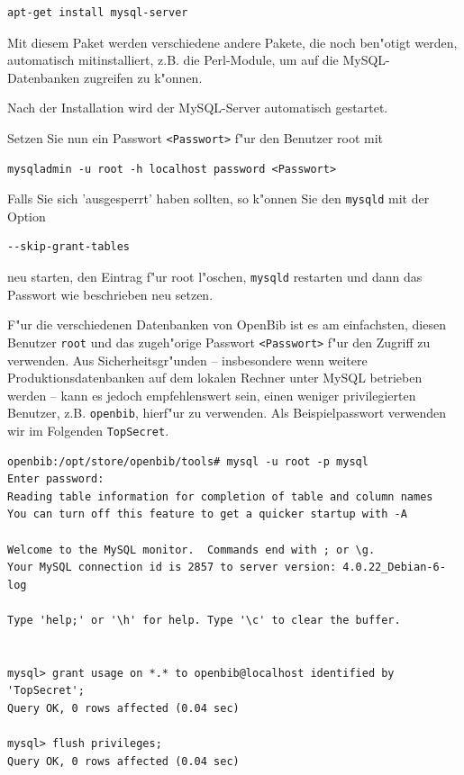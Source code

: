 \documentclass[11pt, twoside, a4paper, BCOR8mm, DIV12, bibtotoc,idxtotoc]{scrbook}
\begin{document}
\begin{verbatim}
apt-get install mysql-server
\end{verbatim}

Mit diesem Paket werden verschiedene andere Pakete, die noch ben"otigt
werden, automatisch mitinstalliert, z.B. die Perl-Module, um auf die
MySQL-Datenbanken zugreifen zu k"onnen.

Nach der Installation wird der MySQL-Server automatisch gestartet.

Setzen Sie nun ein Passwort \texttt{<Passwort>} f"ur den Benutzer root mit

\begin{verbatim}
mysqladmin -u root -h localhost password <Passwort>
\end{verbatim}

Falls Sie sich 'ausgesperrt' haben sollten, so k"onnen Sie den
\texttt{mysqld} mit der Option
\begin{verbatim}
--skip-grant-tables
\end{verbatim}
neu starten, den Eintrag f"ur root l"oschen, \texttt{mysqld} restarten
und dann das Passwort wie beschrieben neu setzen.

F"ur die verschiedenen Datenbanken von OpenBib ist es am einfachsten,
diesen Benutzer \texttt{root} und das zugeh"orige Passwort
\texttt{<Passwort>} f"ur den Zugriff zu verwenden. Aus
Sicherheitsgr"unden -- insbesondere wenn weitere
Produktionsdatenbanken auf dem lokalen Rechner unter MySQL betrieben
werden -- kann es jedoch empfehlenswert sein, einen weniger
privilegierten Benutzer, z.B. \texttt{openbib}, hierf"ur zu verwenden.
Als Beispielpasswort verwenden wir im Folgenden \texttt{TopSecret}.


\begin{verbatim}
openbib:/opt/store/openbib/tools# mysql -u root -p mysql
Enter password:
Reading table information for completion of table and column names
You can turn off this feature to get a quicker startup with -A

Welcome to the MySQL monitor.  Commands end with ; or \g.
Your MySQL connection id is 2857 to server version: 4.0.22_Debian-6-log

Type 'help;' or '\h' for help. Type '\c' to clear the buffer.


mysql> grant usage on *.* to openbib@localhost identified by 'TopSecret';
Query OK, 0 rows affected (0.04 sec)

mysql> flush privileges;
Query OK, 0 rows affected (0.04 sec)
\end{verbatim}
\end{document}
